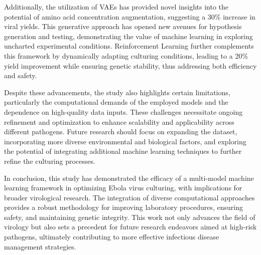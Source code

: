 \documentclass{article}
\begin{document}
Additionally, the utilization of VAEs has provided novel insights into the potential of amino acid concentration augmentation, suggesting a 30\% increase in viral yields. This generative approach has opened new avenues for hypothesis generation and testing, demonstrating the value of machine learning in exploring uncharted experimental conditions. Reinforcement Learning further complements this framework by dynamically adapting culturing conditions, leading to a 20\% yield improvement while ensuring genetic stability, thus addressing both efficiency and safety.

Despite these advancements, the study also highlights certain limitations, particularly the computational demands of the employed models and the dependence on high-quality data inputs. These challenges necessitate ongoing refinement and optimization to enhance scalability and applicability across different pathogens. Future research should focus on expanding the dataset, incorporating more diverse environmental and biological factors, and exploring the potential of integrating additional machine learning techniques to further refine the culturing processes.

In conclusion, this study has demonstrated the efficacy of a multi-model machine learning framework in optimizing Ebola virus culturing, with implications for broader virological research. The integration of diverse computational approaches provides a robust methodology for improving laboratory procedures, ensuring safety, and maintaining genetic integrity. This work not only advances the field of virology but also sets a precedent for future research endeavors aimed at high-risk pathogens, ultimately contributing to more effective infectious disease management strategies.
\end{document}
